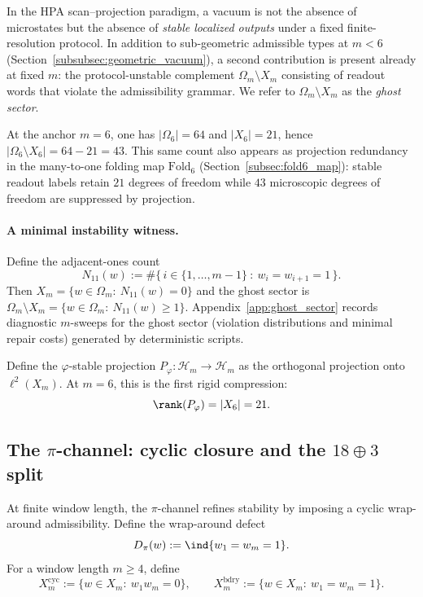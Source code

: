 \begin{remark}\label{rem:ghost_sector_interface}
In the HPA scan--projection paradigm, a vacuum is not the absence of microstates but the absence of \emph{stable localized outputs} under a fixed finite-resolution protocol.
In addition to sub-geometric admissible types at $m<6$ (Section~\ref{subsubsec:geometric_vacuum}), a second contribution is present already at fixed $m$:
the protocol-unstable complement $\Omega_m\setminus X_m$ consisting of readout words that violate the admissibility grammar.
We refer to $\Omega_m\setminus X_m$ as the \emph{ghost sector}.

At the anchor $m=6$, one has $|\Omega_6|=64$ and $|X_6|=21$, hence $|\Omega_6\setminus X_6|=64-21=43$.
This same count also appears as projection redundancy in the many-to-one folding map $\mathrm{Fold}_6$ (Section~\ref{subsec:fold6_map}): stable readout labels retain $21$ degrees of freedom while $43$ microscopic degrees of freedom are suppressed by projection.

\paragraph{A minimal instability witness.}
Define the adjacent-ones count
\[
N_{11}(w):=\#\{\,i\in\{1,\dots,m-1\}\ :\ w_i=w_{i+1}=1\,\}.
\]
Then $X_m=\{w\in\Omega_m:\ N_{11}(w)=0\}$ and the ghost sector is $\Omega_m\setminus X_m=\{w\in\Omega_m:\ N_{11}(w)\ge 1\}$.
Appendix~\ref{app:ghost_sector} records diagnostic $m$-sweeps for the ghost sector (violation distributions and minimal repair costs) generated by deterministic scripts.
\end{remark}

Define the $\varphi$-stable projection $P_\varphi:\mathcal{H}_m\to \mathcal{H}_m$ as the orthogonal projection onto $\ell^2(X_m)$.
At $m=6$, this is the first rigid compression:
\[
\rank(P_\varphi)=|X_6|=21.
\]

\subsection{The \texorpdfstring{$\pi$}{pi}-channel: cyclic closure and the \texorpdfstring{$18\oplus 3$}{18+3} split}
\label{subsec:pi_channel}

At finite window length, the $\pi$-channel refines stability by imposing a cyclic wrap-around admissibility.
Define the wrap-around defect
\[
D_\pi(w):=\ind\{w_1=w_m=1\}.
\]
For a window length $m\ge 4$, define
\[
X_m^{\mathrm{cyc}}:=\{w\in X_m:\ w_1 w_m=0\},
\qquad
X_m^{\mathrm{bdry}}:=\{w\in X_m:\ w_1=w_m=1\}.
\]

